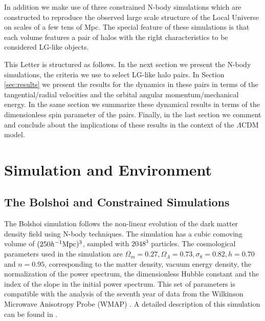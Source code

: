 \documentclass{emulateapj}
\newcommand{\hMpc}{{\ifmmode{h^{-1}{\rm Mpc}}\else{$h^{-1}$Mpc }\fi}}
\begin{document}
In addition we make use of three  constrained N-body simulations which
are constructed to reproduce the observed large scale structure of the
Local Universe on scales of a few tens of Mpc. The special feature of
these simulations is that each volume features a pair of halos with
the right characteristics to be considered LG-like objects. 

This Letter is structured as follows. In the next section we present
the N-body simulations, the criteria we use to select LG-like halo
pairs. In Section \ref{sec:results} we present the results for the
dynamics in these pairs in terms of the tangential/radial velocities
and the orbital angular momentum/mechanical energy. In the same
section we summarize these dynamical results in terms of the
dimensionless spin parameter of the pairs. Finally, in the last
section we comment and conclude about the implications of these
results in the context of the $\Lambda$CDM model. 






\section{Simulation and Environment}
\label{sec:methods}
\subsection{The Bolshoi and Constrained Simulations}



The Bolshoi simulation follows the non-linear evolution of the dark
matter density field using N-body techniques. The simulation has a
cubic comoving volume of $(250\hMpc )^3$, sampled with $2048^{3}$
particles. The cosmological parameters used in the simulation are
$\Omega_{m}=0.27, \Omega_{\Lambda}=0.73, \sigma_{8}=0.82, h=0.70$ and
$n=0.95$, corresponding to the matter density, vacuum energy density,
the normalization of the power spectrum, the dimensionless Hubble
constant and the index of the slope in the initial power
spectrum. This set of parameters is compatible with the analysis  of
the seventh year of data from the Wilkinson Microwave Anisotropy Probe
(WMAP) \citep{Jarosik2011}. A detailed description of this simulation
can be found in \cite{Bolshoi}. 
\end{document}
